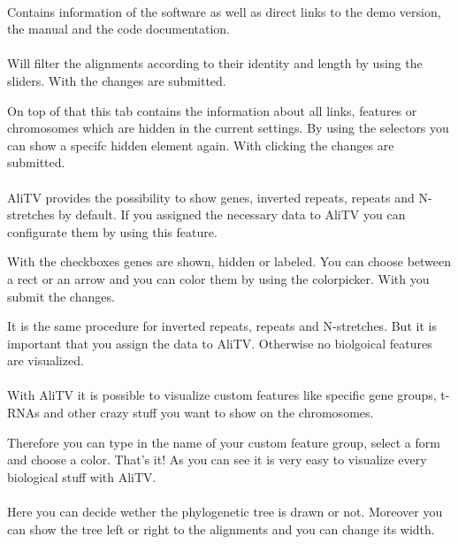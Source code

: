 \documentclass[a4paper]{scrartcl}
\begin{document}
\paragraph*{}
Contains information of the software as well as direct links to the demo version, the manual and the code documentation.

\paragraph*{}
Will filter the alignments according to their identity and length by using the sliders. With  the changes are submitted.

On top of that this tab contains the information about all links, features or chromosomes which are hidden in the current settings. By using the selectors you can show a specifc hidden element again. With clicking  the changes are submitted.

\paragraph*{}
AliTV provides the possibility to show genes, inverted repeats, repeats and N-stretches by default. If you assigned the necessary data to AliTV you can configurate them by using this feature. 

With the checkboxes genes are shown, hidden or labeled. You can choose between a rect or an arrow and you can color them by using the colorpicker. With  you submit the changes.

It is the same procedure for inverted repeats, repeats and N-stretches. But it is important that you assign the data to AliTV. Otherwise no biolgoical features are visualized.

\paragraph*{}
With AliTV it is possible to visualize custom features like specific gene groups, t-RNAs and other crazy stuff you want to show on the chromosomes. 

Therefore you can type in the name of your custom feature group, select a form and choose a color. That's it! As you can see it is very easy to visualize every biological stuff with AliTV.

\paragraph*{}
Here you can decide wether the phylogenetic tree is drawn or not. Moreover you can show the tree left or right to the alignments and you can change its width.
\end{document}
